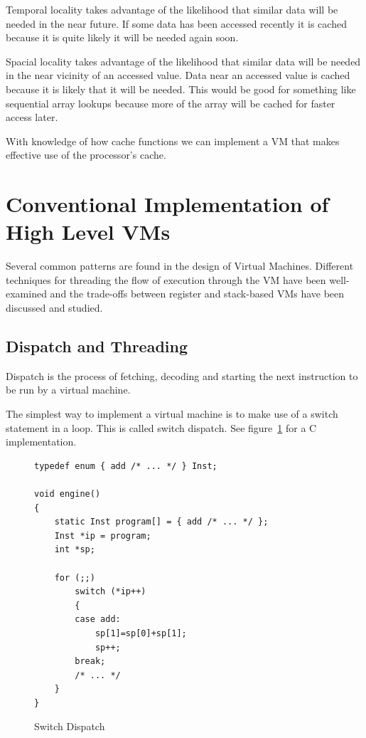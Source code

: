 \documentclass[english,a4paper]{report}
\begin{document}
Temporal locality takes advantage of the likelihood that similar data
will be needed in the near future. If some data has been accessed
recently it is cached because it is quite likely it will be needed
again soon.

Spacial locality takes advantage of the likelihood that similar data
will be needed in the near vicinity of an accessed value. Data near an
accessed value is cached because it is likely that it will be
needed. This would be good for something like sequential array lookups
because more of the array will be cached for faster access later. 

With knowledge of how cache functions we can implement a VM that makes
effective use of the processor's cache.

\section{Conventional Implementation of High Level VMs}

Several common patterns are found in the design of Virtual
Machines. Different techniques for threading the flow of execution
through the VM have been well-examined and the trade-offs between
register and stack-based VMs have been discussed and studied.

\subsection{Dispatch and Threading}

Dispatch is the process of fetching, decoding and starting the next
instruction to be run by a virtual machine.

The simplest way to implement a virtual machine is to make use of a
switch statement in a loop. This is called switch dispatch. See
figure~\ref{fig:switch} for a C implementation.

\begin{figure}
  \begin{lstlisting}
typedef enum { add /* ... */ } Inst; 

void engine() 
{ 
    static Inst program[] = { add /* ... */ }; 
    Inst *ip = program; 
    int *sp; 

    for (;;) 
        switch (*ip++) 
        { 
        case add: 
            sp[1]=sp[0]+sp[1]; 
            sp++; 
        break; 
        /* ... */ 
    }
} 
  \end{lstlisting}
  \caption{Switch Dispatch}
  \label{fig:switch}
\end{figure}
\end{document}
